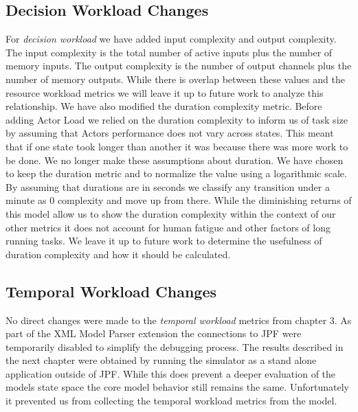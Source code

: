 \subsection{Decision Workload Changes}
For \textit{decision workload} we have added input complexity and output complexity.  The input complexity is the total number of active inputs plus the number of memory inputs.  The output complexity is the number of output channels plus the number of memory outputs.  While there is overlap between these values and the resource workload metrics we will leave it up to future work to analyze this relationship.  We have also modified the duration complexity metric.  Before adding Actor Load we relied on the duration complexity to inform us of task size by assuming that Actors performance does not vary across states.  This meant that if one state took longer than another it was because there was more work to be done.  We no longer make these assumptions about duration.  We have chosen to keep the duration metric and to normalize the value using a logarithmic scale.  By assuming that durations are in seconds we classify any transition under a minute as 0 complexity and move up from there.  While the diminishing returns of this model allow us to show the duration complexity within the context of our other metrics it does not account for human fatigue and other factors of long running tasks.  We leave it up to future work to determine the usefulness of duration complexity and how it should be calculated.

\subsection{Temporal Workload Changes}
No direct changes were made to the \textit{temporal workload} metrics from chapter 3.  As part of the XML Model Parser extension the connections to JPF were temporarily disabled to simplify the debugging process.  The results described in the next chapter were obtained by running the simulator as a stand alone application outside of JPF.  While this does prevent a deeper evaluation of the models state space the core model behavior still remains the same.  Unfortunately it prevented us from collecting the temporal workload metrics from the model.
